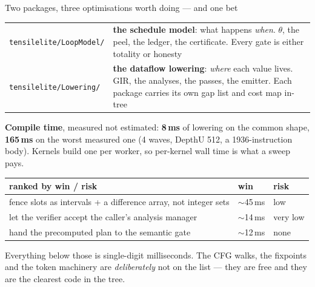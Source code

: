 \documentclass[aspectratio=169,9pt]{beamer}
\newcommand{\key}[1]{\textcolor{acc}{\textbf{#1}}}
\newcommand{\bad}[1]{\textcolor{warn}{\textbf{#1}}}
\newcommand{\good}[1]{\textcolor{ok}{\textbf{#1}}}
\begin{document}
\begin{frame}{Two packages, three optimisations worth doing --- and one bet}
\vspace{-2pt}
{\scriptsize
\begin{tabular}{@{}p{}p{}@{}}
\toprule
\texttt{tensilelite/LoopModel/} & \key{the schedule model}: what happens \emph{when}. $\theta$, the peel, the ledger, the certificate. Every gate is either totality or honesty \\
\texttt{tensilelite/Lowering/} & \key{the dataflow lowering}: \emph{where} each value lives. GIR, the analyses, the passes, the emitter. Each package carries its own gap list and cost map in-tree \\
\bottomrule
\end{tabular}}

\vspace{5pt}
{\footnotesize \key{Compile time}, measured not estimated: \good{8\,ms} of lowering on the common shape, \bad{165\,ms} on the worst measured one (4 waves, DepthU 512, a 1936-instruction body). Kernels build one per worker, so per-kernel wall time is what a sweep pays.}

\vspace{3pt}
{\scriptsize
\begin{tabular}{@{}p{}p{}p{}@{}}
\toprule
\textbf{ranked by win / risk} & \textbf{win} & \textbf{risk} \\
\midrule
fence slots as intervals + a difference array, not integer sets & $\sim$45\,ms & low \\
let the verifier accept the caller's analysis manager & $\sim$14\,ms & very low \\
hand the precomputed plan to the semantic gate & $\sim$12\,ms & none \\
\bottomrule
\end{tabular}}

\vspace{3pt}
{\footnotesize Everything below those is single-digit milliseconds. The CFG walks, the fixpoints and the token machinery are \emph{deliberately} not on the list --- they are free and they are the clearest code in the tree.}

\vspace{6pt}
\begin{center}
\end{center}
\end{frame}
\end{document}

